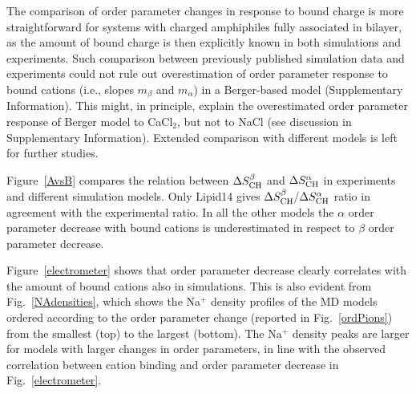 \documentclass[pre,aps,floatfix,authordate1-4,twocolumn]{revtex4-1}
\begin{document}
The comparison of order parameter changes in response to bound charge is more straightforward for
systems with charged amphiphiles fully associated in bilayer, as the amount of bound charge
is then explicitly known in both simulations and experiments. Such comparison
between previously published simulation data \cite{miettinen09} and experiments \cite{scherer89,franzin98}
could not rule out
overestimation of order parameter response to bound cations (i.e., slopes $m_\beta$ and $m_\alpha$)
in a Berger-based model (Supplementary Information).
This might, in principle, explain the overestimated order parameter 
response of Berger model to CaCl$_2$, but not to NaCl (see discussion in Supplementary Information).
Extended comparison with different models is left for further studies.





Figure~\ref{AvsB} compares the relation between $\Delta S_{\rm{CH}}^{\beta}$ and $\Delta S_{\rm{CH}}^{\alpha}$
in experiments~\cite{akutsu81} and different simulation models.
Only Lipid14 gives $\Delta S_{\rm{CH}}^{\beta}/\Delta S_{\rm{CH}}^{\alpha}$ ratio in agreement with the experimental ratio.
In all the other models the $\alpha$ order parameter decrease with bound cations is underestimated in
respect to $\beta$ order parameter decrease.

Figure~\ref{electrometer} shows that order parameter decrease clearly correlates with the
amount of bound cations also in simulations. This is also evident from Fig.~\ref{NAdensities},
which shows the Na$^+$ density profiles of the MD models
ordered according to the order parameter change 
(reported in Fig.~\ref{ordPions}) from the smallest (top) to the largest (bottom).
The Na$^+$ density peaks are larger for models with larger changes in order parameters,
in line with the observed correlation between cation binding and order parameter decrease in
Fig.~\ref{electrometer}.
\end{document}
